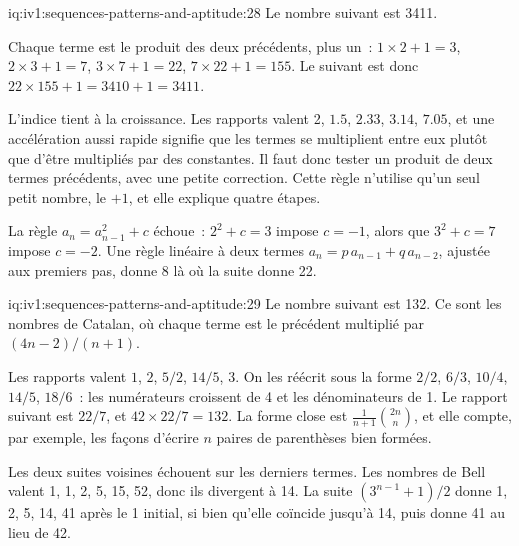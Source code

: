 \begin{solution}{iq:iv1:sequences-patterns-and-aptitude:28}
Le nombre suivant est 3411.

Chaque terme est le produit des deux précédents, plus un~: $1 \times 2 + 1 = 3$, $2 \times 3 + 1 = 7$, $3 \times 7 + 1 = 22$, $7 \times 22 + 1 = 155$. Le suivant est donc $22 \times 155 + 1 = 3410 + 1 = 3411$.

L'indice tient à la croissance. Les rapports valent 2, $1.5$, $2.33$, $3.14$, $7.05$, et une accélération aussi rapide signifie que les termes se multiplient entre eux plutôt que d'être multipliés par des constantes. Il faut donc tester un produit de deux termes précédents, avec une petite correction. Cette règle n'utilise qu'un seul petit nombre, le $+1$, et elle explique quatre étapes.

La règle $a_n = a_{n-1}^2 + c$ échoue~: $2^2 + c = 3$ impose $c = -1$, alors que $3^2 + c = 7$ impose $c = -2$. Une règle linéaire à deux termes $a_n = p\,a_{n-1} + q\,a_{n-2}$, ajustée aux premiers pas, donne 8 là où la suite donne 22.

\end{solution}

\begin{solution}{iq:iv1:sequences-patterns-and-aptitude:29}
Le nombre suivant est 132. Ce sont les nombres de Catalan, où chaque terme est le précédent multiplié par $(4n - 2)/(n + 1)$.

Les rapports valent $1$, $2$, $5/2$, $14/5$, $3$. On les réécrit sous la forme $2/2$, $6/3$, $10/4$, $14/5$, $18/6$~: les numérateurs croissent de 4 et les dénominateurs de 1. Le rapport suivant est $22/7$, et $42 \times 22/7 = 132$. La forme close est $\frac{1}{n + 1}\binom{2n}{n}$, et elle compte, par exemple, les façons d'écrire $n$ paires de parenthèses bien formées.

Les deux suites voisines échouent sur les derniers termes. Les nombres de Bell valent 1, 1, 2, 5, 15, 52, donc ils divergent à 14. La suite $(3^{n-1} + 1)/2$ donne 1, 2, 5, 14, 41 après le 1 initial, si bien qu'elle coïncide jusqu'à 14, puis donne 41 au lieu de 42.

\end{solution}


